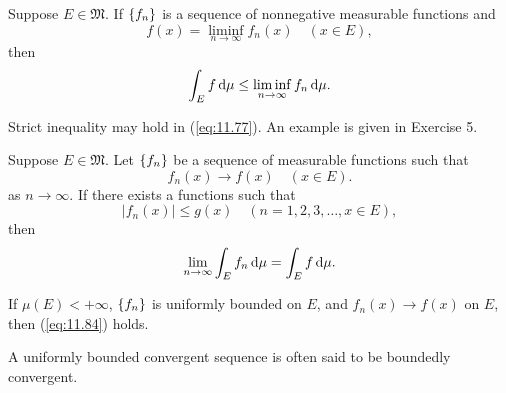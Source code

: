 \begin{thm}
    \label{thm:11.31}
    Suppose $E \in \mathfrak{M}$. 
    If $\protect\{f_n\}$ is a sequence of nonnegative measurable functions and 
    \begin{equation*}
        f(x) = \liminf_{n \rightarrow \infty} f_n (x)
        \quad (x \in E),
    \end{equation*}
    then 
    \begin{equation}
        \label{eq:11.77}
        \int_E f \d \mu \leq
        \liminf _{n \rightarrow \infty} f_n \d \mu .
    \end{equation}
\end{thm}

Strict inequality may hold in (\ref{eq:11.77}). 
An example is given in Exercise 5.

\begin{thm}
    \label{thm:11.32}
    Suppose $E \in \mathfrak{M}$.
    Let $\protect\{f_n\}$ be a sequence of measurable functions such that 
    \begin{equation}
        \label{eq:11.82}
        f_n(x) \rightarrow f(x)
        \quad (x \in E).
    \end{equation}
    as $n \rightarrow \infty$.
    If there exists a functions such that 
    \begin{equation}
        \label{eq:11.83}
        \left| f_n(x) \right| \leq g(x)
        \quad (n = 1,2,3,\dots,x \in E),
    \end{equation}
    then 
    \begin{equation}
        \label{eq:11.84}
        \lim_{n \to \infty} \int_E f_n \d \mu =
        \int_E f \d \mu .
    \end{equation}
\end{thm}

\begin{myCorollary*}
    If $\mu(E) < +\infty$, $\protect\{f_n\}$ is uniformly bounded on $E$, and $f_n(x) \rightarrow f(x)$ on $E$, then (\ref{eq:11.84}) holds.
\end{myCorollary*}

A uniformly bounded convergent sequence is often said to be boundedly
convergent.
